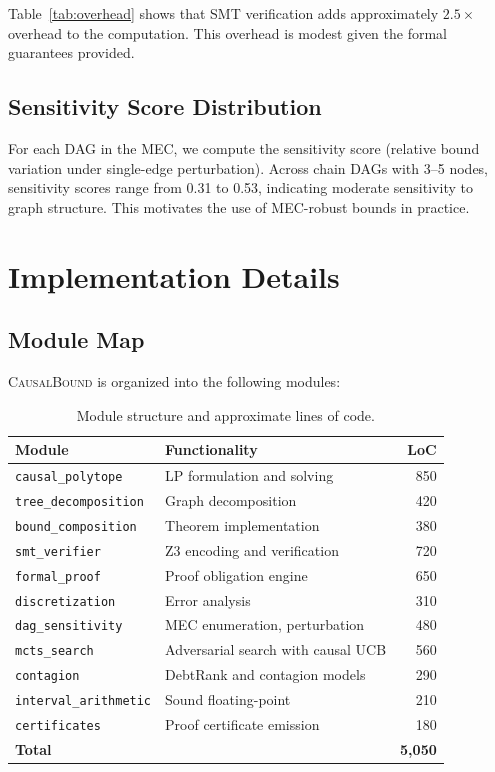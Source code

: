 \documentclass[11pt,a4paper]{article}
\newcommand{\CausalBound}{\textsc{CausalBound}}
\begin{document}
Table~\ref{tab:overhead} shows that SMT verification adds approximately $2.5\times$ overhead to the computation. This overhead is modest given the formal guarantees provided.

\subsection{Sensitivity Score Distribution}

For each DAG in the MEC, we compute the sensitivity score (relative bound variation under single-edge perturbation). Across chain DAGs with 3--5 nodes, sensitivity scores range from 0.31 to 0.53, indicating moderate sensitivity to graph structure. This motivates the use of MEC-robust bounds in practice.

\section{Implementation Details}
\label{app:implementation}

\subsection{Module Map}

\CausalBound{} is organized into the following modules:

\begin{table}[t]
\centering
\caption{Module structure and approximate lines of code.}
\label{tab:modules}
\begin{tabular}{@{}llr@{}}
\toprule
\textbf{Module} & \textbf{Functionality} & \textbf{LoC} \\
\midrule
\texttt{causal\_polytope} & LP formulation and solving & 850 \\
\texttt{tree\_decomposition} & Graph decomposition & 420 \\
\texttt{bound\_composition} & Theorem implementation & 380 \\
\texttt{smt\_verifier} & Z3 encoding and verification & 720 \\
\texttt{formal\_proof} & Proof obligation engine & 650 \\
\texttt{discretization} & Error analysis & 310 \\
\texttt{dag\_sensitivity} & MEC enumeration, perturbation & 480 \\
\texttt{mcts\_search} & Adversarial search with causal UCB & 560 \\
\texttt{contagion} & DebtRank and contagion models & 290 \\
\texttt{interval\_arithmetic} & Sound floating-point & 210 \\
\texttt{certificates} & Proof certificate emission & 180 \\
\midrule
\textbf{Total} & & \textbf{5,050} \\
\bottomrule
\end{tabular}
\end{table}
\end{document}
